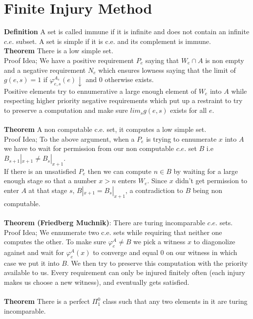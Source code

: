 \documentclass{article}
\begin{document}
	\section{Finite Injury Method}
	\textbf{Definition} A set is called immune if it is infinite and does not contain an infinite $c.e.$ subset. A set is simple if it is c.e. and its complement is immune.\\
	\textbf{Theorem} There is a low simple set.\\
	Proof Idea; We have a positive requirement $P_e$ saying that $W_e\cap A$ is non empty and a negative requirement $N_e$ which ensures lowness saying that the  limit of $g(e,s) = 1$ if $ \varphi^{A_s}_{e,s}(e)\downarrow$ and $0$ otherwise exists.\\Positive elements try to ennumerative a large enough element of $W_e$ into $A$ while respecting higher priority negative requirements which put up a restraint to try to preserve a computation and make sure $lim_s g(e,s)$ exists for all $e$.\\
	\\
	\textbf{Theorem} A non computable c.e. set, it computes a low simple set.\\
	Proof Idea; To the above argument, when a $P_e$ is trying to ennumerate $x$ into $A$ we have to wait for permission from our non computable $c.e.$ set $B$ i.e $B_{s+1}|_{x+1} \neq B_s|_{x+1}$.\\
	If there is an unsatisfied $P_e$ then we can compute $n\in B$ by waiting for a large enough stage so that a number $x>n$ enters $W_e$. Since $x$ didn't get permission to enter $A$ at that stage $s$, $B|_{x+1} = B_s|_{x+1}$, a contradiction to $B$ being non computable.
	\\
	\\
	\textbf{Theorem (Friedberg Muchnik)}: There are turing incomparable $c.e.$ sets.\\
	Proof Idea; We ennumerate two c.e. sets while requiring that neither one computes the other. To make sure $\varphi_e^A \neq B$ we pick a witness $x$ to diagonolize against and wait for $\varphi_e^A(x)$ to converge and equal $0$ on our witness in which case we put it into $B$. We then try to preserve this computation with the priority available to us. Every requirement can only be injured finitely often (each injury makes us choose a new witness), and eventually gets satisfied.\\
	\\
	\textbf{Theorem} There is a perfect $\Pi^0_1$ class such that any two elements in it are turing incomparable.\\
\end{document}
